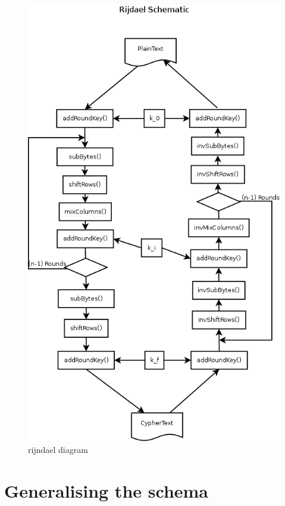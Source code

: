 \documentclass[10pt,a4paper,twoside]{llncs}
\begin{document}
\begin{figure}[h!]
 \centering
 \includegraphics[scale=0.3,keepaspectratio=true]{./images/rijndaelDiagram.png}
 \caption{rijndael diagram}
 \label{fig:RijndaelDiagram}
\end{figure}

\section{Generalising the schema}\label{sec:generalising}
\end{document}
